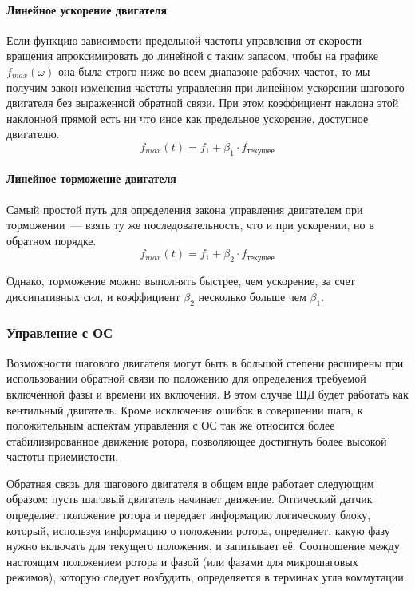 \paragraph{Линейное ускорение двигателя}
Если функцию зависимости предельной частоты управления от скорости вращения апроксимировать до
линейной с таким запасом, чтобы на графике $f_{max}( \omega )$ она была строго ниже во
всем диапазоне рабочих частот, то мы получим закон изменения частоты управления при линейном
ускорении шагового двигателя без выраженной обратной связи. При этом коэффициент наклона этой
наклонной прямой есть ни что иное как предельное ускорение, доступное двигателю.
\begin{equation}
    \label{eq_synchronized_control_max_frequency}
    f_{max}(t) = f_{1} + \beta_{1} \cdot f_{\textit{текущее}}
\end{equation}

\paragraph{Линейное торможение двигателя}
Самый простой путь для определения закона управления двигателем при
торможении~--- взять ту же последовательность, что и при ускорении, но в
обратном порядке.
\begin{equation}
    \label{eq_synchronized_control_min_frequency}
    f_{max}(t) = f_{1} + \beta_{2} \cdot f_{\textit{текущее}}
\end{equation}

Однако, торможение можно выполнять быстрее, чем ускорение, за счет диссипативных сил,
и коэффициент $\beta_{2}$ несколько больше чем $\beta_{1}$.

\newpage
\subsubsection{Управление с ОС}
\label{sec_feedback_control}
Возможности шагового двигателя могут быть в большой степени расширены при использовании обратной
связи по положению для определения требуемой включённой фазы и времени их включения. В этом случае ШД
будет работать как вентильный двигатель. Кроме исключения ошибок в совершении шага, к положительным
аспектам управления с ОС так же относится более стабилизированное движение ротора, позволяющее достигнуть
более высокой частоты приемистости.

Обратная связь для шагового двигателя в общем виде работает следующим образом:
пусть шаговый двигатель начинает движение. Оптический датчик определяет положение ротора и передает
информацию логическому блоку, который, используя информацию о положении ротора, определяет, какую фазу
нужно включать для текущего положения, и запитывает её. Соотношение между настоящим положением
ротора и фазой (или фазами для микрошаговых режимов), которую следует возбудить, определяется
в терминах угла коммутации.

